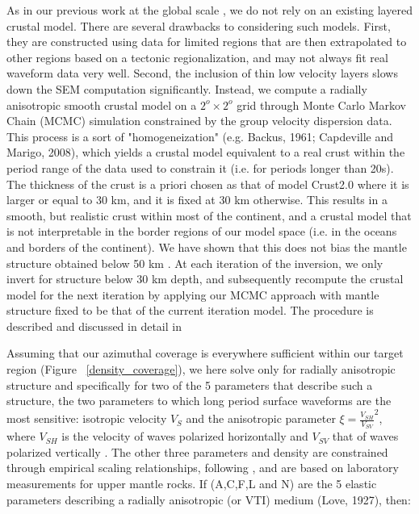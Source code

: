 \documentclass[12pt]{article}
\begin{document}
As in our previous work at the global scale \citep{french2013waveform,french2014whole}, we do not rely on an existing layered crustal model. There are several drawbacks to considering such models. First, they are constructed using data for limited regions that are then extrapolated to other regions based on a tectonic regionalization, and may not always fit real waveform data very well. Second, the inclusion of thin low velocity layers slows down the SEM computation significantly. 
Instead, we compute a radially anisotropic smooth crustal model on a $2^o \times 2^o $ grid through Monte Carlo Markov Chain (MCMC) simulation constrained by the group velocity dispersion data. This process is a sort of "homogeneization" (e.g. Backus, 1961; Capdeville and Marigo, 2008), which yields a crustal model equivalent to a real crust within the period range of the data used to constrain it (i.e. for periods longer than 20s). 
The thickness of the crust is a priori chosen as that of model Crust2.0 \citep{basscrust2} where it is larger or equal to 30 km, and it is fixed at 30 km otherwise. 
This results in a smooth, but realistic crust within most of the continent, and a crustal model that is not interpretable in the border regions of our model space (i.e. in the oceans and borders of the continent). 
We have shown that this does not bias the mantle structure obtained below 50 km \citep{french2014whole}. 
At each iteration of the inversion, we only invert for structure below 30 km depth, and subsequently recompute the crustal model for the next iteration by applying our MCMC approach with mantle structure fixed to be that of the current iteration model. The procedure is described and discussed in detail in \cite{french2014whole}

Assuming that our azimuthal coverage is everywhere sufficient within our target region (Figure ~\ref{density_coverage}), we here solve only for radially anisotropic structure and specifically for two of the 5 parameters that describe such a structure, the two parameters to which long period surface waveforms are the most sensitive: isotropic velocity $V_{S}$ and the anisotropic parameter $\xi = {\frac{V_{SH}}{V_{SV}}}^2$, where $V_{SH}$ is the velocity of waves polarized horizontally and $V_{SV}$ that of waves polarized vertically . 
The other three parameters and density are constrained through empirical scaling relationships, following \cite{montagner1989petrological}, and are based on laboratory measurements for upper mantle rocks. 
If (A,C,F,L and N) are the 5 elastic parameters describing a radially anisotropic (or VTI) medium (Love, 1927), then:
\end{document}
